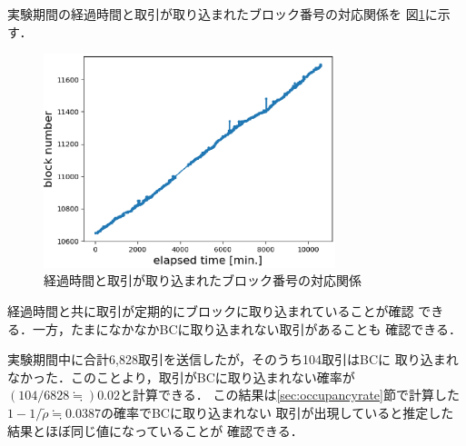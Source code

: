 \documentclass[graybox]{svmult}
\begin{document}
実験期間の経過時間と取引が取り込まれたブロック番号の対応関係を
図\ref{fig:exp3-1}に示す．
%
\begin{figure}[tb]
  \vspace{-20mm}
  \begin{center}
    \includegraphics[width=85mm]{exp3-1.eps}
  \end{center}
  \vspace{20mm}
  \caption{経過時間と取引が取り込まれたブロック番号の対応関係}
  \label{fig:exp3-1}
\end{figure}
%
経過時間と共に取引が定期的にブロックに取り込まれていることが確認
できる．一方，たまになかなかBCに取り込まれない取引があることも
確認できる．

実験期間中に合計6,828取引を送信したが，そのうち104取引はBCに
取り込まれなかった．このことより，取引がBCに取り込まれない確率が
$(104/6828 \fallingdotseq) 0.02$と計算できる．
この結果は\ref{sec:occupancyrate}節で計算した
$1-1/\tilde{\rho} \fallingdotseq 0.0387$の確率でBCに取り込まれない
取引が出現していると推定した結果とほぼ同じ値になっていることが
確認できる．
\end{document}
